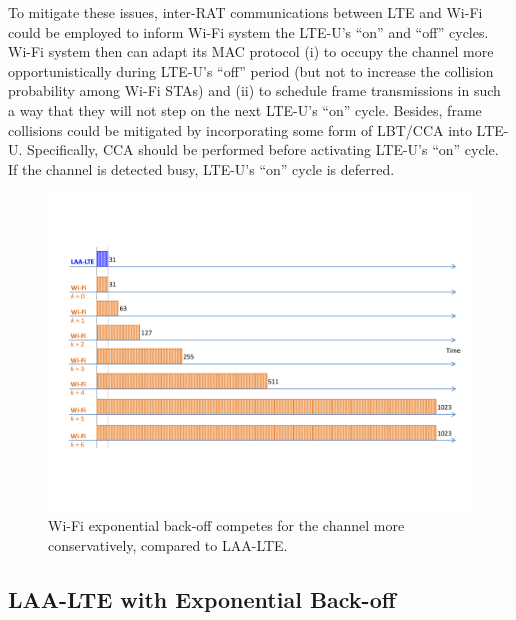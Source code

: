 \documentclass[journal,draftclsnofoot,12pt,onecolumn]{IEEEtran}
\begin{document}
To mitigate these issues, inter-RAT communications between LTE and Wi-Fi could be employed to inform Wi-Fi system the LTE-U's ``on'' and ``off'' cycles. Wi-Fi system then can adapt its MAC protocol (i) to occupy the channel more opportunistically during LTE-U's ``off'' period (but not to increase the collision probability among Wi-Fi STAs) and (ii) to schedule frame transmissions in such a way that they will not step on the next LTE-U's ``on'' cycle. Besides, frame collisions could be mitigated by incorporating some form of LBT/CCA into LTE-U. Specifically, CCA should be performed before activating LTE-U's ``on'' cycle. If the channel is detected busy, LTE-U's ``on'' cycle is deferred.

\begin{figure}[!t]
\centering
\includegraphics[width=1.0\columnwidth]{figures2/LAA-LTE-enhacement-back-off}
\caption{Wi-Fi exponential back-off competes for the channel more conservatively, compared to LAA-LTE.}
\label{figs:LAA-LTE-enhacement-back-off}
\end{figure}

\subsection{LAA-LTE with Exponential Back-off}
\label{subsection:exp-back-off}
\end{document}
